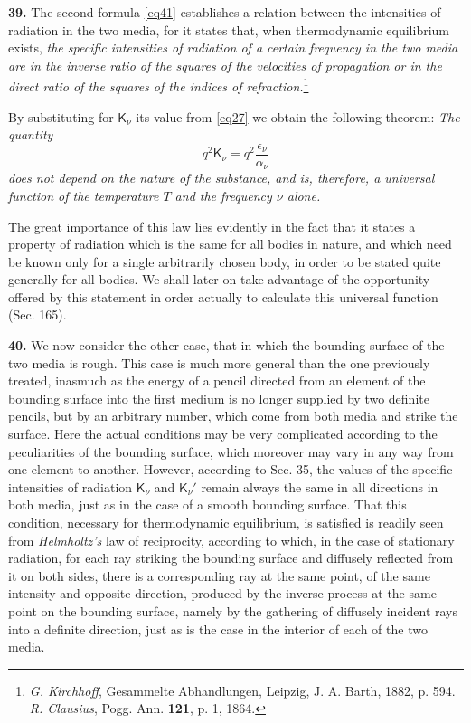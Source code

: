 \documentclass[12pt,oneside]{book}
\begin{document}
\textbf{39.} The second formula \eqref{eq41} establishes a relation between the intensities of radiation in the two media, for it states that, when thermodynamic equilibrium exists, \textit{the specific intensities of radiation of a certain frequency in the two media are in the inverse ratio of the squares of the velocities of propagation or in the direct ratio of the squares of the indices of refraction.}\footnote{\textit{G. Kirchhoff}, Gesammelte Abhandlungen, Leipzig, J. A. Barth, 1882, p. 594. \textit{R. Clausius}, Pogg. Ann. \textbf{121}, p. 1, 1864.} \par 

By substituting for $\mathsf{K}_\nu$ its value from \eqref{eq27} we obtain the following theorem: \textit{The quantity}
\begin{equation}
    \label{eq42}
    q^2\mathsf{K}_\nu=q^2\frac{\epsilon_\nu}{\alpha_\nu}
\end{equation}
\textit{does not depend on the nature of the substance, and is, therefore, a universal function of the temperature $T$ and the frequency $\nu$ alone.} \par 

The great importance of this law lies evidently in the fact that it states a property of radiation which is the same for all bodies in nature, and which need be known only for a single arbitrarily chosen body, in order to be stated quite generally for all bodies. We shall later on take advantage of the opportunity offered by this statement in order actually to calculate this universal function (Sec. 165). \par 

\textbf{40.} We now consider the other case, that in which the bounding surface of the two media is rough. This case is much more general than the one previously treated, inasmuch as the energy of a pencil directed from an element of the bounding surface into the first medium is no longer supplied by two definite pencils, but by an arbitrary number, which come from both media and strike the surface. Here the actual conditions may be very complicated according to the peculiarities of the bounding surface, which moreover may vary in any way from one element to another. However, according to Sec. 35, the values of the specific intensities of radiation $\mathsf{K}_\nu$ and $\mathsf{K}_\nu'$ remain always the same in all directions in both media, just as in the case of a smooth bounding surface. That this condition, necessary for thermodynamic equilibrium, is satisfied is readily seen from \textit{Helmholtz's} law of reciprocity, according to which, in the case of stationary radiation, for each ray striking the bounding surface and diffusely reflected from it on both sides, there is a corresponding ray at the same point, of the same intensity and opposite direction, produced by the inverse process at the same point on the bounding surface, namely by the gathering of diffusely incident rays into a definite direction, just as is the case in the interior of each of the two media. \par 
\end{document}
